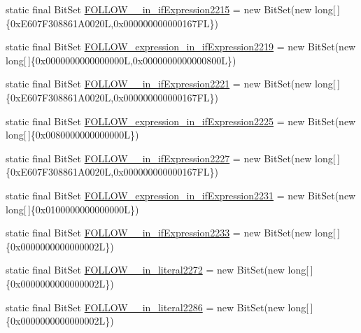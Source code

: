 \begin{DoxyCompactItemize}
static final Bit\-Set \hyperlink{classorg_1_1tzi_1_1use_1_1parser_1_1ocl_1_1_o_c_l_parser_a6afd29c839b4c0326665dd2c3d55ed33}{F\-O\-L\-L\-O\-W\-\_\-\_\-in\-\_\-if\-Expression2215} = new Bit\-Set(new long\mbox{[}$\,$\mbox{]}\{0x\-E607\-F308861\-A0020\-L,0x000000000000167\-F\-L\})
\item 
static final Bit\-Set \hyperlink{classorg_1_1tzi_1_1use_1_1parser_1_1ocl_1_1_o_c_l_parser_a0dd1b7764ed9fccf841d561810571c5b}{F\-O\-L\-L\-O\-W\-\_\-expression\-\_\-in\-\_\-if\-Expression2219} = new Bit\-Set(new long\mbox{[}$\,$\mbox{]}\{0x0000000000000000\-L,0x0000000000000800\-L\})
\item 
static final Bit\-Set \hyperlink{classorg_1_1tzi_1_1use_1_1parser_1_1ocl_1_1_o_c_l_parser_afefda95aa2dd08efe08913f9ff19dd27}{F\-O\-L\-L\-O\-W\-\_\-\_\-in\-\_\-if\-Expression2221} = new Bit\-Set(new long\mbox{[}$\,$\mbox{]}\{0x\-E607\-F308861\-A0020\-L,0x000000000000167\-F\-L\})
\item 
static final Bit\-Set \hyperlink{classorg_1_1tzi_1_1use_1_1parser_1_1ocl_1_1_o_c_l_parser_a6a9061dc8487846c7bc9fd76501ab1c7}{F\-O\-L\-L\-O\-W\-\_\-expression\-\_\-in\-\_\-if\-Expression2225} = new Bit\-Set(new long\mbox{[}$\,$\mbox{]}\{0x0080000000000000\-L\})
\item 
static final Bit\-Set \hyperlink{classorg_1_1tzi_1_1use_1_1parser_1_1ocl_1_1_o_c_l_parser_a0bde6b040fb67488d0a35e233476264e}{F\-O\-L\-L\-O\-W\-\_\-\_\-in\-\_\-if\-Expression2227} = new Bit\-Set(new long\mbox{[}$\,$\mbox{]}\{0x\-E607\-F308861\-A0020\-L,0x000000000000167\-F\-L\})
\item 
static final Bit\-Set \hyperlink{classorg_1_1tzi_1_1use_1_1parser_1_1ocl_1_1_o_c_l_parser_a77c49282b0f45dea6d44c841b6ded234}{F\-O\-L\-L\-O\-W\-\_\-expression\-\_\-in\-\_\-if\-Expression2231} = new Bit\-Set(new long\mbox{[}$\,$\mbox{]}\{0x0100000000000000\-L\})
\item 
static final Bit\-Set \hyperlink{classorg_1_1tzi_1_1use_1_1parser_1_1ocl_1_1_o_c_l_parser_af11ea2a326aadebda9157f3fa61a758a}{F\-O\-L\-L\-O\-W\-\_\-\_\-in\-\_\-if\-Expression2233} = new Bit\-Set(new long\mbox{[}$\,$\mbox{]}\{0x0000000000000002\-L\})
\item 
static final Bit\-Set \hyperlink{classorg_1_1tzi_1_1use_1_1parser_1_1ocl_1_1_o_c_l_parser_af2a00cdcb521d6556d523be965a826ed}{F\-O\-L\-L\-O\-W\-\_\-\_\-in\-\_\-literal2272} = new Bit\-Set(new long\mbox{[}$\,$\mbox{]}\{0x0000000000000002\-L\})
\item 
static final Bit\-Set \hyperlink{classorg_1_1tzi_1_1use_1_1parser_1_1ocl_1_1_o_c_l_parser_ab4b8aa192edf04f3d45489eb0e7f26cf}{F\-O\-L\-L\-O\-W\-\_\-\_\-in\-\_\-literal2286} = new Bit\-Set(new long\mbox{[}$\,$\mbox{]}\{0x0000000000000002\-L\})

\end{DoxyCompactItemize}
